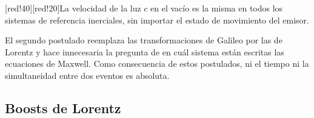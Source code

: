 \documentclass[]{article}
\numberwithin{equation}{section}
\begin{document}
[red!40][red!20]{La velocidad de la luz $c$ en el vacío es la misma en todos los sistemas de referencia inerciales, sin importar el estado de movimiento del emisor.}

El segundo postulado reemplaza las transformaciones de Galileo por las de Lorentz y hace innecesaria la pregunta de en cuál sistema están escritas las ecuaciones de Maxwell. Como consecuencia de estos postulados, ni el tiempo ni la simultaneidad entre dos eventos es absoluta.

\subsection{Boosts de Lorentz}

\end{document}

